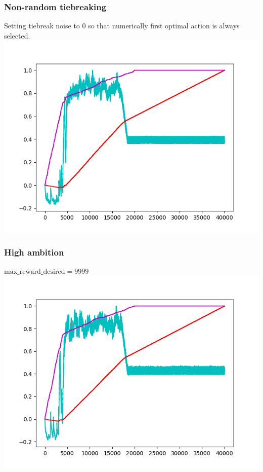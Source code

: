 \documentclass{article}
\begin{document}
\subsubsection{Non-random tiebreaking}
Setting tiebreak noise to $0$ so that numerically first optimal action is
always selected.\\
\includegraphics{borgies_tiebreak0000.png}

\subsubsection{High ambition}
$\mathrm{max\_reward\_desired} = 9999$\\
\includegraphics{borgies_ambition99990000.png}
\end{document}
